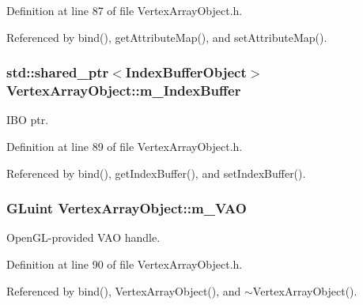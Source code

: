 Definition at line 87 of file Vertex\+Array\+Object.\+h.



Referenced by bind(), get\+Attribute\+Map(), and set\+Attribute\+Map().

\subsubsection[{\texorpdfstring{m\+\_\+\+Index\+Buffer}{m_IndexBuffer}}]{\setlength{\rightskip}{0pt plus 5cm}std\+::shared\+\_\+ptr$<${\bf Index\+Buffer\+Object}$>$ Vertex\+Array\+Object\+::m\+\_\+\+Index\+Buffer\hspace{0.3cm}{\ttfamily [private]}}\hypertarget{class_vertex_array_object_acd24cb60a9b2efe8e81cf50f1a6ebe1a}{}\label{class_vertex_array_object_acd24cb60a9b2efe8e81cf50f1a6ebe1a}


I\+BO ptr. 



Definition at line 89 of file Vertex\+Array\+Object.\+h.



Referenced by bind(), get\+Index\+Buffer(), and set\+Index\+Buffer().

\subsubsection[{\texorpdfstring{m\+\_\+\+V\+AO}{m_VAO}}]{\setlength{\rightskip}{0pt plus 5cm}G\+Luint Vertex\+Array\+Object\+::m\+\_\+\+V\+AO\hspace{0.3cm}{\ttfamily [private]}}\hypertarget{class_vertex_array_object_a9def0a990bac4db152e962d4d1a84f0f}{}\label{class_vertex_array_object_a9def0a990bac4db152e962d4d1a84f0f}


Open\+G\+L-\/provided V\+AO handle. 



Definition at line 90 of file Vertex\+Array\+Object.\+h.



Referenced by bind(), Vertex\+Array\+Object(), and $\sim$\+Vertex\+Array\+Object().

